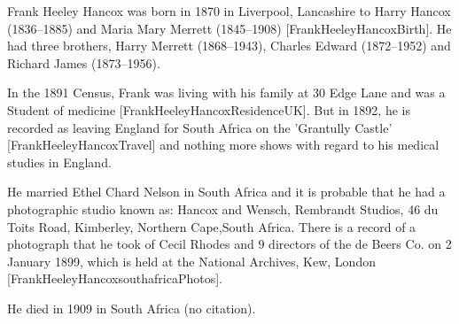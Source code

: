 
Frank Heeley Hancox was born in 1870 in Liverpool, Lancashire to Harry Hancox (1836--1885) and Maria Mary Merrett (1845--1908) [FrankHeeleyHancoxBirth]. He had three brothers, Harry Merrett (1868--1943), Charles Edward (1872--1952) and Richard James (1873--1956).

In the 1891 Census, Frank was living with his family at 30 Edge Lane and was a Student of medicine [FrankHeeleyHancoxResidenceUK].  But in 1892, he is recorded as leaving England for South Africa on the 'Grantully Castle' [FrankHeeleyHancoxTravel] and nothing more shows with regard to his medical studies in England. 

He married Ethel Chard Nelson in South Africa and it is probable that he had a photographic studio known as: Hancox and Wensch, Rembrandt Studios, 46 du Toits Road, Kimberley, Northern Cape,South Africa. There is a record of a photograph that he took of Cecil Rhodes and 9 directors of the de Beers Co. on 2 January 1899, which is held at the National Archives, Kew, London  [FrankHeeleyHancoxsouthafricaPhotos].

He died in 1909 in South Africa (no citation). 

   
